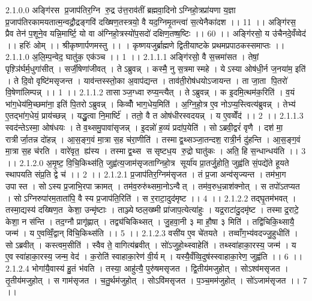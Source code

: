 2.1.0.0
अङ्गि॑रस प्र॒जाप॑तिर॒ग्नि रु॒द्र उ॑त्त॒राव॑तीं ब्रह्मवा॒दिनोऽग्निहो॒त्रप्रा॑यणा य॒ज्ञा प्र॒जाप॑तिरकामयतात्म॒न्वद्रौ॒द्रङ्गवि॑ दख्षिण॒तस्त्रयो॒ वै यद॒ग्निमृ॒तन्त्वा॑ स॒त्येनैका॑दश ।। 11 ।। अङ्गि॑रस॒ प्रैव तेन॑ प॒शूने॒व यन्नि॒मार्ष्टि॒ यो वा अ॑ग्निहो॒त्रस्यो॑प॒सदो॑ दक्षिण॒तष्ष॒ष्टिः ।। 60 ।। अङ्गि॑रसो॒ य उ॑चैनदे॒वँव्वेद॑ ।। हरिः॑ ओम् ।। श्रीकृष्णार्पणमस्तु ।। । कृष्णयजुर्ब्राह्मणे द्वितीयाष्टके प्रथमप्रपाठकस्समाप्तः ।।
2.1.1.0
अ॒लि॒म्प॒न्वेद॒ घातु॑क॒ एक॑ञ्च ।। 1 ।।
2.1.1.1
अङ्गि॑रसो॒ वै स॒त्त्रमा॑सत । तेषां॒ पृश़्ञि॑र्घर्म॒धुगा॑सीत् । सर्जी॒षेणा॑जीवत् । तेऽब्रुवन्न् । कस्मै॒ नु स॒त्रमास्महे । येऽस्या ओष॑धी॒र्न ज॒नया॑म॒ इति॑ । ते दि॒वो वृष्टि॑मसृजन्त । याव॑न्तस्स्तो॒का अ॒वाप॑द्यन्त । ताव॑ती॒रोष॑धयोऽजायन्त । ता जा॒ता पि॒तरो॑ वि॒षेणा॑लिम्पन्न् ।। 1 ।।
2.1.1.2
तासाञ्ज॒ग्ध्वा रुप्य॒न्त्यैत् । तेऽब्रुवन्न् । क इ॒दमि॒त्थम॑क॒रिति॑ । व॒यं भा॑ग॒धेय॑मि॒च्छमा॑ना॒ इति॑ पि॒तरोऽब्रुवन्न् । किव्वोँ॑ भाग॒धेय॒मिति॑ । अ॒ग्नि॒हो॒त्र ए॒व नोऽप्य॒स्त्वित्य॑ब्रुवन्न् । तेभ्य॑ ए॒तद्भा॑ग॒धेयं॒ प्राय॑च्छन्न् । यद्धु॒त्वा नि॒मार्ष्टि॑ । ततो॒ वै त ओष॑धीरस्वदयन्न् । य ए॒वव्वेँद॑ ।। 2 ।।
2.1.1.3
स्वद॑न्तेऽस्मा॒ ओष॑धयः । ते व॒थ्समु॒पावा॑सृजन्न् । इ॒दन्नो॑ ह॒व्यं प्रदा॑प॒येति॑ । सोऽब्रवी॒द्वरं॑ वृणै । दश॑ मा॒ रात्रीर्जा॒तन्न दो॑हन्न् । आ॒स॒ङ्ग॒वं मा॒त्रा स॒ह च॑रा॒णीति॑ । तस्माद्व॒थ्सञ्जा॒तन्दश॒ रात्री॒र्न दु॑हन्ति । आ॒स॒ङ्ग॒वं मा॒त्रा स॒ह च॑रति । वारे॑वृत॒॒ ह्य॑स्य । तस्माद्व॒थ्स स॑सृष्टध॒य रु॒द्रो घातु॑कः । अति॒ हि स॒न्धान्धय॑ति ।। 3 ।।
2.1.2.0
अ॒मृ॒ष्ट॒ वि॒चि॒किथ्स॑ति॒ जुह्व॑त्य॒जाम॑सृजताग्निहो॒त्र सूर्या॑य प्रा॒तर्जु॒होति॒ जुह्व॑ति सं॒पद्ये॑ते हूयते स्थापयति संप्र॒ति द्वे च॑ ।। 2 ।।
2.1.2.1
प्र॒जाप॑तिर॒ग्निम॑सृजत । तं प्र॒जा अन्व॑सृज्यन्त । तम॑भा॒ग उपास्त । सोऽस्य प्र॒जाभि॒रपाक्रामत् । तम॑व॒रुरु॑थ्समा॒नोऽन्वैत् । तम॑व॒रुध॒न्नाश॑क्नोत् । स तपो॑ऽतप्यत । सोऽग्निरुपा॑रम॒ताता॑पि॒ वै स्य प्र॒जाप॑ति॒रिति॑ । स र॒राटा॒दुद॑मृष्ट ।। 4 ।।
2.1.2.2
तद्घृ॒तम॑भवत् । तस्मा॒द्यस्य॑ दख्षिण॒त केशा॒ उन्मृ॑ष्टाः । ताञ्ज्येष्ठल॒ख्ष्मी प्रा॑जाप॒त्येत्या॑हुः । यद्र॒राटा॑दु॒दमृ॑ष्ट । तस्माद्र॒राटे॒ केशा॒ न स॑न्ति । तद॒ग्नौ प्रागृ॑ह्णात् । तद्व्य॑चिकिथ्सत् । जु॒हवा॒नी ३ मा हौ॒षा ३ मिति॑ । तद्वि॑चिकि॒थ्सायै॒ जन्म॑ । य ए॒वव्विँ॒द्वान् वि॑चि॒किथ्स॑ति ।। 5 ।।
2.1.2.3
वसी॑य ए॒व चे॑तयते । तव्वाँग॒भ्य॑वदज्जु॒हुधीति॑ । सोऽब्रवीत् । कस्त्वम॒सीति॑ । स्वैव ते॒ वागित्य॑ब्रवीत् । सो॑ऽजुहो॒थ्स्वाहेति॑ । तथ्स्वा॑हाका॒रस्य॒ जन्म॑ । य ए॒वस्वा॑हाका॒रस्य॒ जन्म॒ वेद॑ । क॒रोति॑ स्वाहाका॒रेण॑ वी॒र्यम् । यस्यै॒वँव्वि॒दुष॑स्स्वाहाका॒रेण॒ जुह्व॑ति ।। 6 ।।
2.1.2.4
भोगा॑यै॒वास्य॑ हु॒तं भ॑वति । तस्या॒ आहु॑त्यै॒ पुरु॑षमसृजत । द्वि॒तीय॑मजुहोत् । सोऽश्व॑मसृजत । तृ॒तीय॑मजुहोत् । स गाम॑सृजत । च॒तु॒र्थम॑जुहोत् । सोऽवि॑मसृजत । प॒ञ्च॒मम॑जुहोत् । सो॑ऽजाम॑सृजत ।। 7 ।।
